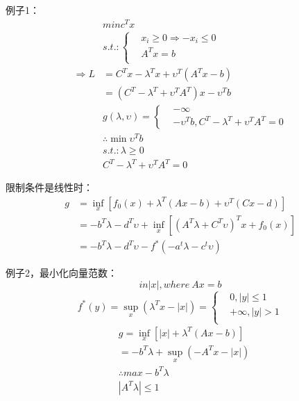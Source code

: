 \documentclass[UTF8]{../computerUniverse}
\begin{document}
例子1：
\begin{equation}
\begin{split}
&min c^Tx\\
&s.t.:
\begin{cases}
&x_i\geqslant0 \Rightarrow -x_i\leqslant 0\\
&A^Tx=b\\
\end{cases}\\
\Rightarrow L&=C^Tx-\lambda^Tx+\upsilon ^T(A^Tx-b)\\
&=\left( C^T-\lambda ^T +\upsilon ^TA^T \right)x-\upsilon ^Tb\\
&g(\lambda, \upsilon)= 
    \begin{cases}
      &-\infty \\
      &-\upsilon ^Tb, C^T-\lambda ^T +\upsilon ^TA^T=0
    \end{cases} \\
&\therefore \min \upsilon ^Tb\\
&s.t.:\lambda \geqslant 0\\
&C^T-\lambda ^T +\upsilon ^TA^T=0
\end{split}
\end{equation}
 
限制条件是线性时：
\begin{equation}
    \begin{split}
    g&=\inf_x \left[ f_0(x)+\lambda ^T(Ax-b)+\upsilon ^T(Cx-d) \right]\\
    &=-b^T\lambda-d^T\upsilon +\inf_x \left[ \left( A^T\lambda +C^T\upsilon \right)^Tx+f_0(x) \right]\\
    &= -b^T\lambda-d^T\upsilon-f^*\left( -a^t\lambda-c^t\upsilon \right)
    \end{split}
\end{equation}
 
例子2，最小化向量范数：
\begin{equation}
 in|x|, where \ Ax=b
\end{equation}
\begin{equation}
 f^*(y)=\sup_x \left( \lambda^Tx-|x| \right)=\left\{  
  \begin{aligned}
     &0,|y|\leqslant 1\\
    &+\infty,|y|>1\\
  \end{aligned} \right.
\end{equation}
\begin{equation}
    \begin{split}
    &g=\inf_x \left[ |x|+\lambda^T(Ax-b) \right]\\
    &=-b^T\lambda+\sup_x \left( -A^Tx-|x| \right)\\
    & \therefore max -b^T\lambda\\
    & |A^T\lambda|\leqslant1
    \end{split}
\end{equation}
  
\end{document}
